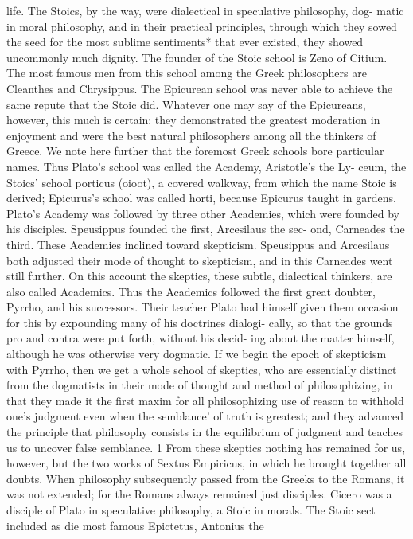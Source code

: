 life.
The Stoics, by the way, were dialectical in speculative philosophy, dog-
matic in moral philosophy, and in their practical principles, through which
they sowed the seed for the most sublime sentiments* that ever existed,
they showed uncommonly much dignity. The founder of the Stoic school
is Zeno of Citium. The most famous men from this school among the
Greek philosophers are Cleanthes and Chrysippus.
The Epicurean school was never able to achieve the same repute that
the Stoic did. Whatever one may say of the Epicureans, however, this
much is certain: they demonstrated the greatest moderation in enjoyment
and were the best natural philosophers among all the thinkers of Greece.
We note here further that the foremost Greek schools bore particular
names. Thus Plato's school was called the Academy, Aristotle's the Ly-
ceum, the Stoics' school porticus (oioot), a covered walkway, from which
the name Stoic is derived; Epicurus's school was called horti, because
Epicurus taught in gardens.
Plato's Academy was followed by three other Academies, which were
founded by his disciples. Speusippus founded the first, Arcesilaus the sec-
ond, Carneades the third.
These Academies inclined toward skepticism. Speusippus and Arcesilaus
both adjusted their mode of thought to skepticism, and in this Carneades
went still further. On this account the skeptics, these subtle, dialectical
thinkers, are also called Academics. Thus the Academics followed the first
great doubter, Pyrrho, and his successors. Their teacher Plato had himself
given them occasion for this by expounding many of his doctrines dialogi-
cally, so that the grounds pro and contra were put forth, without his decid-
ing about the matter himself, although he was otherwise very dogmatic.
If we begin the epoch of skepticism with Pyrrho, then we get a whole
school of skeptics, who are essentially distinct from the dogmatists in their
mode of thought and method of philosophizing, in that they made it the
first maxim for all philosophizing use of reason to withhold one's judgment
even when the semblance' of truth is greatest; and they advanced the principle
that philosophy consists in the equilibrium of judgment and teaches us to uncover
false semblance. 1 From these skeptics nothing has remained for us, however,
but the two works of Sextus Empiricus, in which he brought together all
doubts.
When philosophy subsequently passed from the Greeks to the Romans, it
was not extended; for the Romans always remained just disciples.
Cicero was a disciple of Plato in speculative philosophy, a Stoic in
morals. The Stoic sect included as die most famous Epictetus, Antonius the

